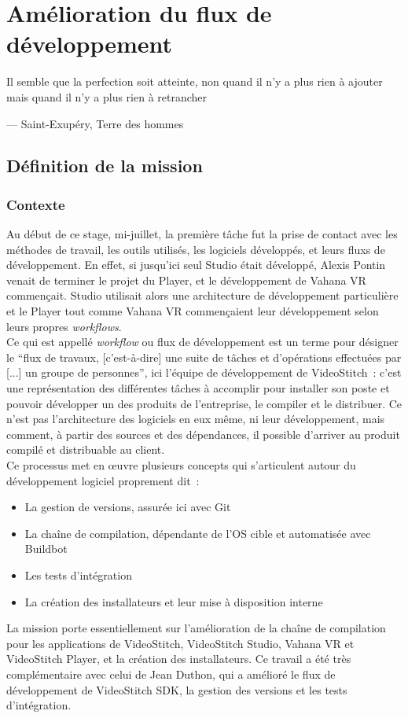 \chapter{Amélioration du flux de développement}
\epigraph{Il semble que la perfection soit atteinte, non quand il n'y a plus 
rien à ajouter mais quand il n'y a plus rien à retrancher}{--- \small{\textup{Saint-Exupéry,
Terre des hommes}}}

\section{Définition de la mission}
\subsection{Contexte}
Au début de ce stage, mi-juillet, la première tâche fut la prise de contact avec 
les méthodes de travail, les outils utilisés, les logiciels développés, et leurs
fluxs de développement. En effet, si jusqu'ici seul Studio était développé, Alexis
Pontin venait de terminer le projet du Player, et le développement de Vahana
VR commençait. Studio utilisait alors une architecture de développement particulière
et le Player tout comme Vahana VR commençaient leur développement selon leurs propres
\textit{workflows}.\\
\newline
Ce qui est appellé \textit{workflow} ou flux de développement est un terme pour désigner le 
\enquote{flux de travaux, [c'est-à-dire] une suite de tâches et
d'opérations effectuées par [...] un groupe de personnes}\cite{workflow}, ici l'équipe de développement
de VideoStitch~: c'est une représentation des différentes tâches à accomplir pour installer
son poste et pouvoir développer un des produits de l'entreprise, le compiler et le distribuer.
Ce n'est pas l'architecture des logiciels en eux même, ni leur développement,
mais comment, à partir des sources et des dépendances, il possible d'arriver au produit
compilé et distribuable au client.\\
Ce processus met en \oe uvre plusieurs concepts qui s'articulent autour du développement
logiciel proprement dit~:\cite{software-build}\cite{build-automation}
\begin{itemize}
  \item La gestion de versions, assurée ici avec Git\cite{gestion-versions}
  \item La chaîne de compilation, dépendante de l'OS cible et automatisée avec Buildbot \cite{chaine-compilation}
  \item Les tests d'intégration\cite{integration-continue}
  \item La création des installateurs et leur mise à disposition interne\\
\end{itemize}
La mission porte essentiellement sur l'amélioration de la chaîne de compilation
pour les applications de VideoStitch, VideoStitch Studio, Vahana VR et VideoStitch
Player, et la création des installateurs. Ce travail a été très complémentaire avec
celui de Jean Duthon, qui a amélioré le flux de développement de VideoStitch SDK,
la gestion des versions et les tests d'intégration.

